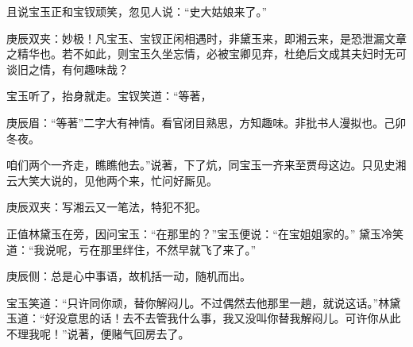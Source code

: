 \begin{parag}
    且说宝玉正和宝钗顽笑，忽见人说：“史大姑娘来了。”\begin{note}庚辰双夹：妙极！凡宝玉、宝钗正闲相遇时，非黛玉来，即湘云来，是恐泄漏文章之精华也。若不如此，则宝玉久坐忘情，必被宝卿见弃，杜绝后文成其夫妇时无可谈旧之情，有何趣味哉？\end{note}宝玉听了，抬身就走。宝钗笑道：“等著，\begin{note}庚辰眉：“等著”二字大有神情。看官闭目熟思，方知趣味。非批书人漫拟也。己卯冬夜。\end{note}咱们两个一齐走，瞧瞧他去。”说著，下了炕，同宝玉一齐来至贾母这边。只见史湘云大笑大说的，见他两个来，忙问好厮见。\begin{note}庚辰双夹：写湘云又一笔法，特犯不犯。\end{note}正值林黛玉在旁，因问宝玉：“在那里的？”宝玉便说：“在宝姐姐家的。” 黛玉冷笑道：“我说呢，亏在那里绊住，不然早就飞了来了。”\begin{note}庚辰侧：总是心中事语，故机括一动，随机而出。\end{note}宝玉笑道：“只许同你顽，替你解闷儿。不过偶然去他那里一趟，就说这话。”林黛玉道：“好没意思的话！去不去管我什么事，我又没叫你替我解闷儿。可许你从此不理我呢！”说著，便赌气回房去了。
\end{parag}


